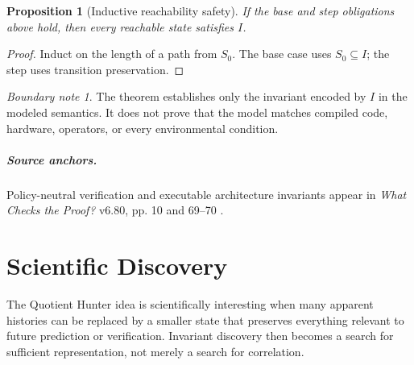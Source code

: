 \documentclass[11pt,oneside]{book}
\newtheorem{proposition}[theorem]{Proposition}
\theoremstyle{definition}
\theoremstyle{remark}
\newtheorem{boundary}[theorem]{Boundary note}
\begin{document}
\begin{proposition}[Inductive reachability safety]
If the base and step obligations above hold, then every reachable state satisfies \(I\).
\end{proposition}

\begin{proof}
Induct on the length of a path from \(S_0\). The base case uses \(S_0\subseteq I\); the step uses
transition preservation.
\end{proof}

\begin{boundary}
The theorem establishes only the invariant encoded by \(I\) in the modeled semantics. It does not
prove that the model matches compiled code, hardware, operators, or every environmental condition.
\end{boundary}

\paragraph{Source anchors.} Policy-neutral verification and executable architecture invariants appear
in \emph{What Checks the Proof?} v6.80, pp. 10 and 69--70 \cite{TennesonChecks}.

\chapter{Scientific Discovery}
\label{ch:science}

The Quotient Hunter idea is scientifically interesting when many apparent histories can be replaced
by a smaller state that preserves everything relevant to future prediction or verification. Invariant
discovery then becomes a search for sufficient representation, not merely a search for correlation.
\end{document}
